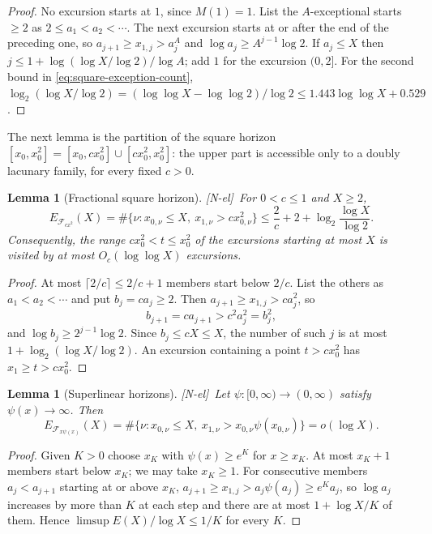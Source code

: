 \documentclass[11pt,reqno]{amsart}
\numberwithin{equation}{section}
\theoremstyle{plain}
\newtheorem{lemma}[theorem]{Lemma}
\theoremstyle{definition}
\theoremstyle{remark}
\newcommand{\F}{\mathcal{F}}
\newcommand{\tagNE}{\textup{[N-el]}}
\begin{document}
\begin{proof}
No excursion starts at $1$, since $M(1)=1$. List the $A$-exceptional starts
$\ge2$ as $2\le a_1<a_2<\cdots$. The next excursion starts at or after the
end of the preceding one, so $a_{j+1}\ge x_{1,j}>a_j^A$ and
$\log a_j\ge A^{j-1}\log2$. If $a_j\le X$ then
$j\le1+\log(\log X/\log2)/\log A$; add $1$ for the excursion $(0,2]$. For the
second bound in \eqref{eq:square-exception-count},
$\log_2(\log X/\log2)=(\log\log X-\log\log2)/\log2\le1.443\log\log X+0.529$.
\end{proof}

The next lemma is the partition of the square horizon
$[x_0,x_0^2]=[x_0,cx_0^2]\cup[cx_0^2,x_0^2]$: the upper part is accessible
only to a doubly lacunary family, for every fixed $c>0$.

\begin{lemma}[Fractional square horizon]
\label{lem:partition}
\tagNE\ For $0<c\le1$ and $X\ge2$,
\begin{equation}
\label{eq:partition-count}
E_{\F_{cx^2}}(X)=\#\{\nu:x_{0,\nu}\le X,\ x_{1,\nu}>cx_{0,\nu}^2\}
\le\frac2c+2+\log_2\frac{\log X}{\log2}.
\end{equation}
Consequently, the range $cx_0^2<t\le x_0^2$ of the excursions starting at
most $X$ is visited by at most $O_c(\log\log X)$ excursions.
\end{lemma}

\begin{proof}
At most $\lceil2/c\rceil\le2/c+1$ members start below $2/c$. List the others
as $a_1<a_2<\cdots$ and put $b_j=ca_j\ge2$. Then
$a_{j+1}\ge x_{1,j}>ca_j^2$, so
\begin{equation}
b_{j+1}=ca_{j+1}>c^2a_j^2=b_j^2,
\end{equation}
and $\log b_j\ge2^{j-1}\log2$. Since $b_j\le cX\le X$, the number of such
$j$ is at most $1+\log_2(\log X/\log2)$. An excursion containing a point
$t>cx_0^2$ has $x_1\ge t>cx_0^2$.
\end{proof}

\begin{lemma}[Superlinear horizons]
\label{lem:superlinear}
\tagNE\ Let $\psi:[0,\infty)\to(0,\infty)$ satisfy $\psi(x)\to\infty$. Then
\begin{equation}
E_{\F_{x\psi(x)}}(X)
=\#\{\nu:x_{0,\nu}\le X,\ x_{1,\nu}>x_{0,\nu}\psi(x_{0,\nu})\}
=o(\log X).
\end{equation}
\end{lemma}

\begin{proof}
Given $K>0$ choose $x_K$ with $\psi(x)\ge e^K$ for $x\ge x_K$. At most
$x_K+1$ members start below $x_K$; we may take $x_K\ge1$. For consecutive members
$a_j<a_{j+1}$ starting at or above $x_K$,
$a_{j+1}\ge x_{1,j}>a_j\psi(a_j)\ge e^Ka_j$, so $\log a_j$ increases by more
than $K$ at each step and there are at most $1+\log X/K$ of them. Hence
$\limsup E(X)/\log X\le1/K$ for every $K$.
\end{proof}
\end{document}
